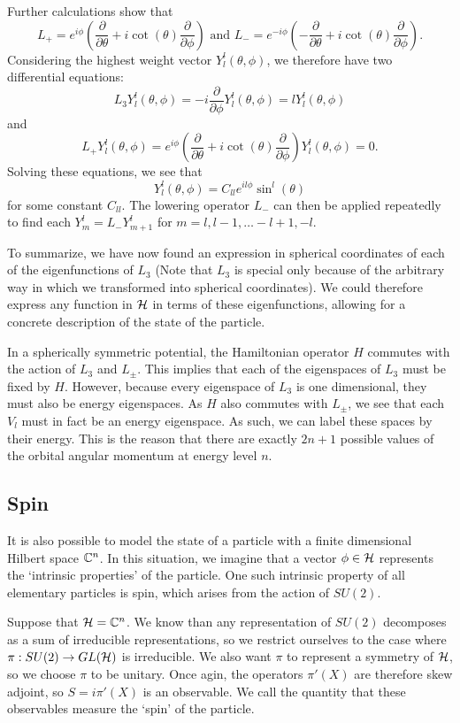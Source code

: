 \documentclass[a4paper]{article}
\begin{document}
Further calculations show that 
$$L_{+} = e^{i\phi} \left(\frac{\partial}{\partial \theta} + i\cot(\theta)\frac{\partial}{\partial \phi}\right) \text{  and  } L_{-} =  e^{-i\phi} \left(-\frac{\partial}{\partial \theta} + i\cot(\theta)\frac{\partial}{\partial \phi}\right).$$
Considering the highest weight vector $Y^l_{l}(\theta, \phi)$, we therefore have two differential equations: $$L_3 Y^l_{l}(\theta, \phi) = -i \frac{\partial}{\partial \phi} Y^l_{l}(\theta, \phi) = l Y^l_{l}(\theta, \phi)$$ 
and 
$$L_{+} Y^l_{l}(\theta, \phi) =  e^{i\phi} \left(\frac{\partial}{\partial \theta} + i\cot(\theta)\frac{\partial}{\partial \phi}\right)Y^l_{l}(\theta, \phi) = 0.$$
Solving these equations, we see that 
$$Y^l_{l}(\theta, \phi) = C_{ll} e^{il\phi}\sin^{l}(\theta)$$
for some constant $C_{ll}$. The lowering operator $L_{-}$ can then be applied repeatedly to find each $Y^l_{m} = L_{-}Y^l_{m+1}$ for $m = l, l -1, \hdots -l + 1, -l$.

To summarize, we have now found an expression in spherical coordinates of each of the eigenfunctions of $L_3$ (Note that $L_3$ is special only because of the arbitrary way in which we transformed into spherical coordinates). We could therefore express any function in $\mathcal{H}$ in terms of these eigenfunctions, allowing for a concrete description of the state of the particle.

In a spherically symmetric potential, the Hamiltonian operator $H$ commutes with the action of $L_3$ and $L_{\pm}$. This implies that each of the eigenspaces of $L_3$ must be fixed by $H$. However, because every eigenspace of $L_3$ is one dimensional, they must also be energy eigenspaces. As $H$ also commutes with $L_{\pm}$, we see that each $V_l$ must in fact be an energy eigenspace. As such, we can label these spaces by their energy. This is the reason that there are exactly $2n+ 1$ possible values of the orbital angular momentum at energy level $n$.

\subsection{Spin}
It is also possible to model the state of a particle with a finite dimensional Hilbert space $\mathbb{C}^n$. In this situation, we imagine that a vector $\phi \in \mathcal{H}$ represents the `intrinsic properties' of the particle. One such intrinsic property of all elementary particles is spin, which arises from the action of $SU(2)$. 

Suppose that $\mathcal{H} = \mathbb{C}^n$. We know than any representation of $SU(2)$ decomposes as a sum of irreducible representations, so we restrict ourselves to the case where $\pi : SU(2) \to GL(\mathcal{H})$ is irreducible. We also want $\pi$ to represent a symmetry of $\mathcal{H}$, so we choose $\pi$ to be unitary. Once agin, the operators $\pi'(X)$ are therefore skew adjoint, so $S = i\pi'(X)$ is an observable. We call the quantity that these observables measure the `spin' of the particle. 
\end{document}
